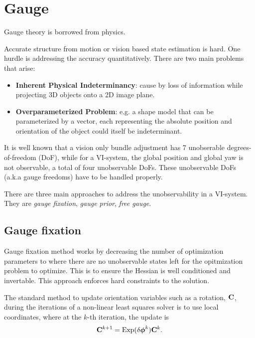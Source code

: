 \section{Gauge}

Gauge theory is borrowed from physics.

Accurate structure from motion or vision based state estimation is hard. One
hurdle is addressing the accuracy quantitatively. There are two main problems
that arise:

\begin{itemize}
  \item{\textbf{Inherent Physical Indeterminancy}: cause by loss of information
    while projecting 3D objects onto a 2D image plane.}
  \item{\textbf{Overparameterized Problem}: e.g. a shape model that can be
    parameterized by a vector, each representing the absolute position and
    orientation of the object could itself be indeterminant.}
\end{itemize}

It is well known that a vision only bundle adjustment has 7 unobserable
degrees-of-freedom (DoF), while for a VI-system, the global position and global
yaw is not observable, a total of four unobservable DoFs. These unobservable
DoFs (a.k.a gauge freedoms) have to be handled properly.

There are three main approaches to address the unobservability in a VI-system.
They are \textit{gauge fixation}, \textit{gauge prior}, \textit{free gauge}.


\subsection{Gauge fixation}

Gauge fixation method works by decreasing the number of optimization parameters to
where there are no unobservable states left for the opitmization problem to
optimize. This is to ensure the Hessian is well conditioned and invertable.
This approach enforces hard constraints to the solution.

The standard method to update orientation variables such as a rotation,
${{\mathbf{C}}}$, during the iterations of a non-linear least squares solver is to use
local coordinates, where at the $k$-th iteration, the update is
%
\begin{equation}
  \label{eq:opt-rot_std_update}
  {{\mathbf{C}}}^{k + 1} = \text{Exp}(\delta \boldsymbol{\phi}^{k}) {{\mathbf{C}}}^{k} .
\end{equation}

